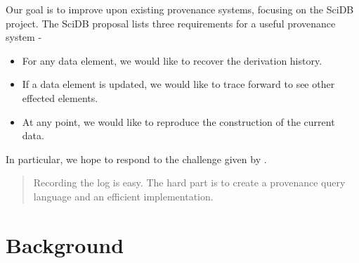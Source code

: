\documentclass[11pt]{article}
\begin{document}
Our goal is to improve upon existing provenance systems, focusing on the SciDB project. The SciDB proposal \cite{stonebraker9requirements} lists three requirements for a useful provenance system -

\begin{itemize}
\item For any data element, we would like to recover the derivation history. 
\item If a data element is updated, we would like to trace forward to see other effected elements.
\item At any point, we would like to reproduce the construction of the current data. 
\end{itemize}

In particular, we hope to respond to the challenge given by \cite{cudré2009demonstration}.

\begin{quote}
Recording the log is easy. The hard part is to create a provenance query language and an efficient implementation.  
\end{quote}

\section{Background}


% 
% 
% 
% 
% 
% 
\end{document}
